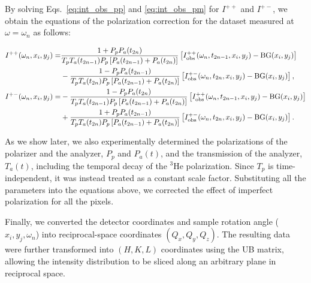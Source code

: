 \documentclass[%
 reprint,
superscriptaddress,
 amsmath,amssymb,
 aps,
floatfix,
]{revtex4-2}
\newcommand{\He}{$^3$He }
\newcommand{\Hensf}{$^3$He-NSF}
\begin{document}
By solving Eqs.~\ref{eq:int_obs_pp} and \ref{eq:int_obs_pm} for $I^{++}$ and $I^{+-}$, we obtain the equations of the polarization correction for the dataset measured at $\omega=\omega_n$ as follows:
\begin{widetext}
    \begin{align}
        I^{++}(\omega_n,x_i,y_j) =&
        \frac{1+P_pP_a(t_{2n})}
        {T_pT_a(t_{2n-1})P_p\left[P_a(t_{2n-1})+P_a(t_{2n})\right]}
        \left[I^{++}_\mathrm{obs}(\omega_n,t_{2n-1},x_i,y_j)-\mathrm{BG}(x_i,y_j)\right]
        \notag\\
        &-
        \frac{1-P_pP_a(t_{2n-1})}
        {T_pT_a(t_{2n})P_p\left[P_a(t_{2n-1})+P_a(t_{2n})\right]}
        \left[I^{+-}_\mathrm{obs}(\omega_n,t_{2n},x_i,y_j)-\mathrm{BG}(x_i,y_j)\right],
        \\
        I^{+-}(\omega_n,x_i,y_j) =&
        -
        \frac{1-P_pP_a(t_{2n})}
        {T_pT_a(t_{2n-1})P_p\left[P_a(t_{2n-1})+P_a(t_{2n})\right]}
        \left[I^{++}_\mathrm{obs}(\omega_n,t_{2n-1},x_i,y_j)-\mathrm{BG}(x_i,y_j)\right]
        \notag\\
        &+
        \frac{1+P_pP_a(t_{2n-1})}
        {T_pT_a(t_{2n})P_p\left[P_a(t_{2n-1})+P_a(t_{2n})\right]}
        \left[I^{+-}_\mathrm{obs}(\omega_n,t_{2n},x_i,y_j)-\mathrm{BG}(x_i,y_j)\right].
        \label{eq:int_corr}
    \end{align}
\end{widetext}
As we show later, we also experimentally determined the polarizations of the polarizer and the analyzer, $P_p$ and $P_a(t)$, and the transmission of the analyzer, $T_a(t)$, including the temporal decay of the \He polarization.
Since $T_p$ is time-independent, it was instead treated as a constant scale factor.
Substituting all the parameters into the equations above, we corrected the effect of imperfect polarization for all the pixels.

Finally, we converted the detector coordinates and sample rotation angle ($x_i,y_j, \omega_n$) into reciprocal-space coordinates $(Q_x,Q_y,Q_z)$.
The resulting data were further transformed into $(H,K,L)$ coordinates using the UB matrix, allowing the intensity distribution to be sliced along an arbitrary plane in reciprocal space.
\end{document}
